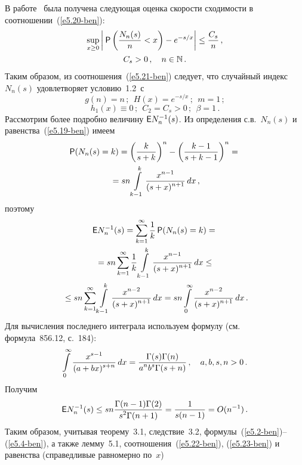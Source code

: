 \begin{multicols}{2}
В работе~\cite{11-ben} была получена следующая оценка скорости
сходимости в соотношении~(\ref{e5.20-ben}):
\begin{multline}
\sup\limits_{x\ge0} \left|\:{{\sf P}}\left(\displaystyle\frac{\displaystyle N_n(s)\mathstrut}{\displaystyle n\mathstrut} <  x\right) -
e^{-s/x} \right| \leq \displaystyle\frac{\displaystyle C_s\mathstrut}{\displaystyle n\mathstrut}\,, \\    C_s > 0\,, \quad
n\in\mathbb N\,.\label{e5.21-ben}
\end{multline}
Таким образом, из соотношения~(\ref{e5.21-ben}) следует, что случайный индекс
$N_n(s)$ удовлетворяет усло\-вию~1.2~с
\begin{equation}
g(n) = n\,; \ \  H(x) = e^{-s/x}\,; \ \  m = 1\,; \label{e5.22-ben}
\end{equation}
\begin{equation}
h_1(x) \equiv 0\,; \ \    C_2 = C_s > 0\,;  \ \  \beta = 1\,.\label{e5.23-ben}
\end{equation}
Рассмотрим более подробно величину $ {\sf E} N_n^{-1}(s)$. Из определения
с.в.\ $N_n(s)$ и равенства~(\ref{e5.19-ben}) имеем
\begin{multline*}
{{\sf P}}(N_n(s) = k) = \left( \displaystyle\frac{\displaystyle k\mathstrut}{\displaystyle s+k\mathstrut}\right)^n - \left( \displaystyle\frac{\displaystyle k -
1\mathstrut}{\displaystyle s+k-1\mathstrut}\right)^n ={}\\
{}=
 sn \int\limits_{k-1}^ k \displaystyle\frac{\displaystyle x^{n-1}\mathstrut}{\displaystyle (s + x)^{n+1}\mathstrut}\, dx\,,
\end{multline*}
поэтому
\begin{multline*}
{\sf E} N_n^{-1}(s) = \sum\limits_{k=1}^\infty \displaystyle\frac{\displaystyle 1\mathstrut}{\displaystyle k\mathstrut} \,{{\sf P}}(N_n(s) = k) ={}\\
{}=
 sn \sum\limits_{k=1}^\infty \displaystyle\frac{\displaystyle 1\mathstrut}{\displaystyle k\mathstrut} \int\limits_{k-1}^ k
\displaystyle\frac{\displaystyle x^{n-1}\mathstrut}{\displaystyle (s + x)^{n+1}\mathstrut}\, dx \leq{}
\\
{}\leq sn \sum\limits_{k=1}^\infty \int\limits_{k-1}^k \displaystyle\frac{\displaystyle x^{n-2}\mathstrut}{\displaystyle (s +
x)^{n+1}\mathstrut}\, dx =
 sn \int\limits_{0}^\infty \displaystyle\frac{\displaystyle x^{n-2}\mathstrut}{\displaystyle (s + x)^{n+1}\mathstrut} \,dx\,.\hspace*{-0.76227pt}
\end{multline*}
Для вычисления последнего интеграла используем формулу (см.~\cite{13-ben} формула~856.12, с.~184):
$$
\int\limits_{0}^\infty \displaystyle\frac{\displaystyle x^{s-1}\mathstrut}{\displaystyle (a + bx)^{s+n}\mathstrut} \,dx =
\displaystyle\frac{\displaystyle \Gamma(s)\Gamma(n)\mathstrut}{\displaystyle a^n b^s\Gamma(s+n)\mathstrut}\,,  \ \ \  a, b, s, n>0\,.
$$
Получим
\begin{equation*}
{\sf E} N_n^{-1}(s) \leq sn \displaystyle\frac{\displaystyle \Gamma(n-1)\Gamma(2)\mathstrut}{\displaystyle s^2\Gamma(n+1)\mathstrut} =
\displaystyle\frac{\displaystyle 1\mathstrut}{\displaystyle s(n - 1)\mathstrut} = {O}(n^{-1})\,. \label{e5.24-ben}
\end{equation*}
Таким образом, учитывая теорему~3.1, следствие~3.2, формулы~(\ref{e5.2-ben})--(\ref{e5.4-ben}), 
а также лемму~5.1, соотношения~(\ref{e5.22-ben}), (\ref{e5.23-ben}) и
равенства (справедливые равномерно по~$x$)

\end{multicols}
